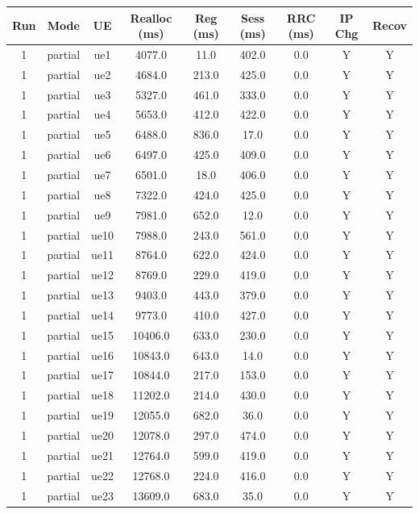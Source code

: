 \begin{table}[ht]
\centering
\begin{tabular}{|c|c|c|c|c|c|c|c|c|}
\hline
Run & Mode & UE & Realloc (ms) & Reg (ms) & Sess (ms) & RRC (ms) & IP Chg & Recov \\
\hline
1 & partial & ue1 & 4077.0 & 11.0 & 402.0 & 0.0 & Y & Y \\
1 & partial & ue2 & 4684.0 & 213.0 & 425.0 & 0.0 & Y & Y \\
1 & partial & ue3 & 5327.0 & 461.0 & 333.0 & 0.0 & Y & Y \\
1 & partial & ue4 & 5653.0 & 412.0 & 422.0 & 0.0 & Y & Y \\
1 & partial & ue5 & 6488.0 & 836.0 & 17.0 & 0.0 & Y & Y \\
1 & partial & ue6 & 6497.0 & 425.0 & 409.0 & 0.0 & Y & Y \\
1 & partial & ue7 & 6501.0 & 18.0 & 406.0 & 0.0 & Y & Y \\
1 & partial & ue8 & 7322.0 & 424.0 & 425.0 & 0.0 & Y & Y \\
1 & partial & ue9 & 7981.0 & 652.0 & 12.0 & 0.0 & Y & Y \\
1 & partial & ue10 & 7988.0 & 243.0 & 561.0 & 0.0 & Y & Y \\
1 & partial & ue11 & 8764.0 & 622.0 & 424.0 & 0.0 & Y & Y \\
1 & partial & ue12 & 8769.0 & 229.0 & 419.0 & 0.0 & Y & Y \\
1 & partial & ue13 & 9403.0 & 443.0 & 379.0 & 0.0 & Y & Y \\
1 & partial & ue14 & 9773.0 & 410.0 & 427.0 & 0.0 & Y & Y \\
1 & partial & ue15 & 10406.0 & 633.0 & 230.0 & 0.0 & Y & Y \\
1 & partial & ue16 & 10843.0 & 643.0 & 14.0 & 0.0 & Y & Y \\
1 & partial & ue17 & 10844.0 & 217.0 & 153.0 & 0.0 & Y & Y \\
1 & partial & ue18 & 11202.0 & 214.0 & 430.0 & 0.0 & Y & Y \\
1 & partial & ue19 & 12055.0 & 682.0 & 36.0 & 0.0 & Y & Y \\
1 & partial & ue20 & 12078.0 & 297.0 & 474.0 & 0.0 & Y & Y \\
1 & partial & ue21 & 12764.0 & 599.0 & 419.0 & 0.0 & Y & Y \\
1 & partial & ue22 & 12768.0 & 224.0 & 416.0 & 0.0 & Y & Y \\
1 & partial & ue23 & 13609.0 & 683.0 & 35.0 & 0.0 & Y & Y \\

\end{tabular}
\end{table}
